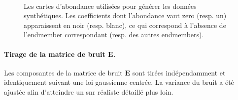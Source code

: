 \begin{figure}[h!]
    \centering
    \hspace{0.1\textwidth}
    \\
    \hspace{0.1\textwidth}
    \caption{Les cartes d'abondance utilisées pour générer les données synthétiques. Les coefficients dont l'abondance vaut zero (resp. un) apparaissent en noir (resp. blanc), ce qui correspond à l'absence de l'endmember correspondant (resp. des autres endmembers).
        \protect\label{fig-cartes-abondance-synth}}
\end{figure}

\paragraph{Tirage de la matrice de bruit $\mathbf{E}$.} Les composantes de la matrice de bruit $\mathbf{E}$ sont tirées indépendamment et identiquement suivant une loi gaussienne centrée. La variance du bruit a été ajustée afin d'atteindre un \gls{snr} réaliste détaillé plus loin.

